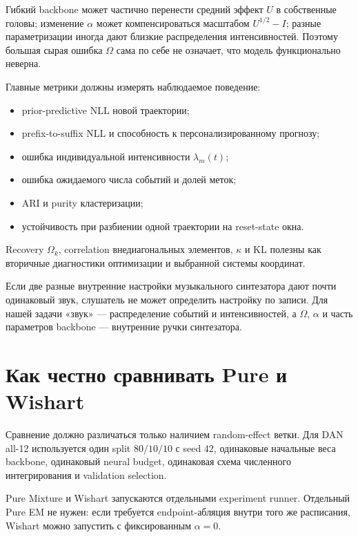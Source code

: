 \documentclass[12pt,a4paper]{article}
\newenvironment{intuitionbox}{\par\medskip\noindent{\color{blue}\bfseries Интуиция. }\ignorespaces}{\par\medskip}
\begin{document}
Гибкий backbone может частично перенести средний эффект \(U\) в собственные головы; изменение \(\alpha\) может компенсироваться масштабом \(U^{1/2}-I\); разные параметризации иногда дают близкие распределения интенсивностей. Поэтому большая сырая ошибка \(\Omega\) сама по себе не означает, что модель функционально неверна.

Главные метрики должны измерять наблюдаемое поведение:
\begin{itemize}
\item prior-predictive NLL новой траектории;
\item prefix-to-suffix NLL и способность к персонализированному прогнозу;
\item ошибка индивидуальной интенсивности \(\lambda_m(t)\);
\item ошибка ожидаемого числа событий и долей меток;
\item ARI и purity кластеризации;
\item устойчивость при разбиении одной траектории на reset-state окна.
\end{itemize}

Recovery \(\Omega_k\), correlation внедиагональных элементов, \(\kappa\) и KL полезны как вторичные диагностики оптимизации и выбранной системы координат.

\begin{intuitionbox}
Если две разные внутренние настройки музыкального синтезатора дают почти одинаковый звук, слушатель не может определить настройку по записи. Для нашей задачи «звук» --- распределение событий и интенсивностей, а \(\Omega\), \(\alpha\) и часть параметров backbone --- внутренние ручки синтезатора.
\end{intuitionbox}

\section{Как честно сравнивать Pure и Wishart}

Сравнение должно различаться только наличием random-effect ветки. Для DAN all-12 используется один split \(80/10/10\) с seed \(42\), одинаковые начальные веса backbone, одинаковый neural budget, одинаковая схема численного интегрирования и validation selection.

Pure Mixture и Wishart запускаются отдельными experiment runner. Отдельный Pure EM не нужен: если требуется endpoint-абляция внутри того же расписания, Wishart можно запустить с фиксированным \(\alpha=0\).
\end{document}
